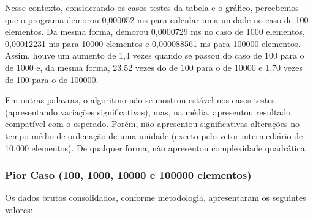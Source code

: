 \documentclass[a4paper, 12pt]{article}
\begin{document}
\vspace{0.6cm}

Nesse contexto, considerando os casos testes da tabela e o gráfico, percebemos que o programa demorou 0,000052 ms para calcular uma unidade no caso de 100 elementos. Da mesma forma, demorou 0,0000729 ms no caso de 1000 elementos, 0,00012231 ms para 10000 elementos e 0,000088561 ms para 100000 elementos. Assim, houve um aumento de 1,4 vezes quando se passou do caso de 100 para o de 1000 e, da mesma forma, 23,52 vezes do de 100 para o de 10000 e 1,70 vezes de 100 para o de 100000.

Em outras palavras, o algoritmo não se mostrou estável nos casos testes (apresentando variações significativas), mas, na média, apresentou resultado compatível com o esperado. Porém, não apresentou significativas alterações no tempo médio de ordenação de uma unidade (exceto pelo vetor intermediário de 10.000 elementos). De qualquer forma, não apresentou complexidade quadrática.

\subsubsection{Pior Caso (100, 1000, 10000 e 100000 elementos)}

\tab{ }Os dados brutos consolidados, conforme metodologia, apresentaram os seguintes valores:
\vspace{0.5cm}
\end{document}
